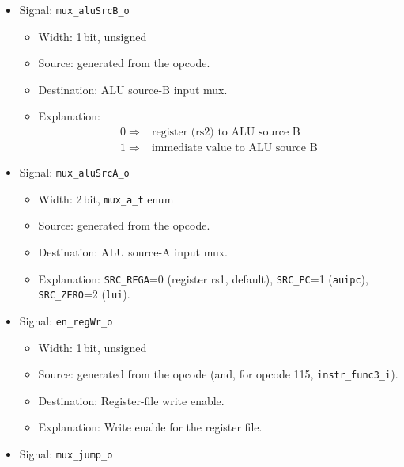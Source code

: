 \begin{itemize}
\begin{itemize}
    \item Destination: D-Mem/D-Cache read enable; also gates the load-use
      hazard stall in \texttt{RV\_PipelineCacheFwd} (Section~\ref{subsec:pipehazard}).
    \item Explanation: Read-enable for the data memory.
  \end{itemize}
  \item Signal: \texttt{mux\_aluSrcB\_o}
  \begin{itemize}
    \item Width: 1\,bit, unsigned
    \item Source: generated from the opcode.
    \item Destination: ALU source-B input mux.
    \item Explanation: \[ \begin{array}{ll}
                                              0 \Rightarrow & \mbox{register (rs2) to ALU source B} \\
                                              1 \Rightarrow & \mbox{immediate value to ALU source B}
                                              \end{array} \]
  \end{itemize}
  \item Signal: \texttt{mux\_aluSrcA\_o}
  \begin{itemize}
    \item Width: 2\,bit, \texttt{mux\_a\_t} enum
    \item Source: generated from the opcode.
    \item Destination: ALU source-A input mux.
    \item Explanation: \texttt{SRC\_REGA}=0 (register rs1, default),
      \texttt{SRC\_PC}=1 (\texttt{auipc}), \texttt{SRC\_ZERO}=2 (\texttt{lui}).
  \end{itemize}
  \item Signal: \texttt{en\_regWr\_o}
  \begin{itemize}
    \item Width: 1\,bit, unsigned
    \item Source: generated from the opcode (and, for opcode 115, \texttt{instr\_func3\_i}).
    \item Destination: Register-file write enable.
    \item Explanation: Write enable for the register file.
  \end{itemize}
  \item Signal: \texttt{mux\_jump\_o}
  \begin{itemize}

\end{itemize}
\end{itemize}
